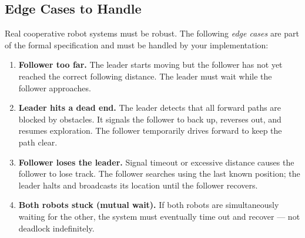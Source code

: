 \documentclass[11pt, a4paper]{article}
\newcommand{\cmark}{\textcolor{mdegreen}{\ding{51}}}
\begin{document}
\subsection{Edge Cases to Handle}

Real cooperative robot systems must be robust.
The following \emph{edge cases} are part of the formal specification and must be
handled by your implementation:

\begin{enumerate}[label=\textbf{EC\arabic*.}]
  \item \textbf{Follower too far.}
        The leader starts moving but the follower has not yet reached the correct
        following distance. The leader must wait while the follower approaches.
  \item \textbf{Leader hits a dead end.}
        The leader detects that all forward paths are blocked by obstacles.
        It signals the follower to back up, reverses out, and resumes exploration.
        The follower temporarily drives forward to keep the path clear.
  \item \textbf{Follower loses the leader.}
        Signal timeout or excessive distance causes the follower to lose track.
        The follower searches using the last known position;
        the leader halts and broadcasts its location until the follower recovers.
  \item \textbf{Both robots stuck (mutual wait).}
        If both robots are simultaneously waiting for the other, the system must
        eventually time out and recover — not deadlock indefinitely.
\end{enumerate}


\end{document}
